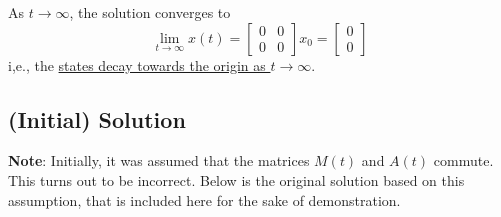 As \( t \rightarrow \infty \), the solution converges to
\begin{equation*}
    \lim_{{t \to \infty}} x(t)
    =
    \begin{bmatrix}
        0 & 0 \\
        0 & 0
    \end{bmatrix}
    x_0
    =
    \begin{bmatrix}
        0 \\
        0
    \end{bmatrix}
\end{equation*}
i,e., the \underline{states decay towards the origin as \( t \rightarrow \infty \)}.

\clearpage
\subsection*{(Initial) Solution}

\textbf{Note}: Initially, it was assumed that the matrices \( M(t) \) and \( A(t) \) commute.
This turns out to be incorrect.
Below is the original solution based on this assumption, that is included here for the sake of demonstration.

